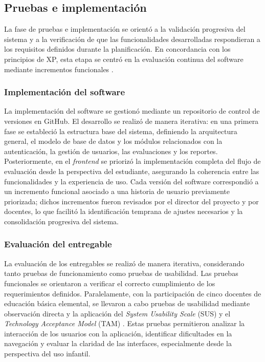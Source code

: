 \subsection{Pruebas e implementación}

La fase de pruebas e implementación se orientó a la validación progresiva del sistema y a la verificación de que las funcionalidades desarrolladas respondieran a los requisitos definidos durante la planificación. En concordancia con los principios de XP, esta etapa se centró en la evaluación continua del software mediante incrementos funcionales \cite{dyba2008agile,shrivastava2021xpreview}.

\subsubsection{Implementación del software}

La implementación del software se gestionó mediante un repositorio de control de versiones en GitHub. El desarrollo se realizó de manera iterativa: en una primera fase se estableció la estructura base del sistema, definiendo la arquitectura general, el modelo de base de datos y los módulos relacionados con la autenticación, la gestión de usuarios, las evaluaciones y los reportes. Posteriormente, en el \textit{frontend} se priorizó la implementación completa del flujo de evaluación desde la perspectiva del estudiante, asegurando la coherencia entre las funcionalidades y la experiencia de uso. Cada versión del software correspondió a un incremento funcional asociado a una historia de usuario previamente priorizada; dichos incrementos fueron revisados por el director del proyecto y por docentes, lo que facilitó la identificación temprana de ajustes necesarios y la consolidación progresiva del sistema.

\subsubsection{Evaluación del entregable}

La evaluación de los entregables se realizó de manera iterativa, considerando tanto pruebas de funcionamiento como pruebas de usabilidad. Las pruebas funcionales se orientaron a verificar el correcto cumplimiento de los requerimientos definidos. Paralelamente, con la participación de cinco docentes de educación básica elemental, se llevaron a cabo pruebas de usabilidad mediante observación directa y la aplicación del \textit{System Usability Scale} (SUS) y el \textit{Technology Acceptance Model} (TAM) \cite{brooke1996sus,davis1989tam,vlachogianni2022sus}. Estas pruebas permitieron analizar la interacción de los usuarios con la aplicación, identificar dificultades en la navegación y evaluar la claridad de las interfaces, especialmente desde la perspectiva del uso infantil.

